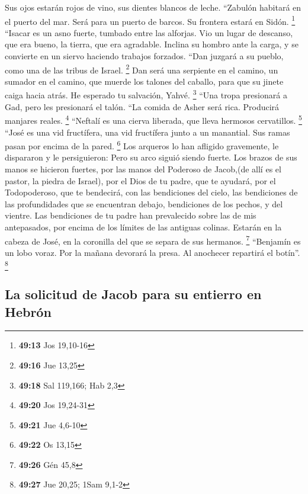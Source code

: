 \begin{paracol}{2}
 Sus ojos estarán rojos de vino, sus dientes blancos de
leche.  ``Zabulón habitará en el puerto del mar. Será
para un puerto de barcos. Su frontera estará en Sidón. \footnote{\textbf{49:13}
  Jos 19,10-16}  ``Isacar es un asno fuerte, tumbado
entre las alforjas.  Vio un lugar de descanso, que era
bueno, la tierra, que era agradable. Inclina su hombro ante la carga, y
se convierte en un siervo haciendo trabajos forzados. 
``Dan juzgará a su pueblo, como una de las tribus de Israel. \footnote{\textbf{49:16}
  Jue 13,25}  Dan será una serpiente en el camino, un
sumador en el camino, que muerde los talones del caballo, para que su
jinete caiga hacia atrás.  He esperado tu salvación,
Yahvé. \footnote{\textbf{49:18} Sal 119,166; Hab 2,3} 
``Una tropa presionará a Gad, pero les presionará el talón.
 ``La comida de Asher será rica. Producirá manjares
reales. \footnote{\textbf{49:20} Jos 19,24-31}  ``Neftalí
es una cierva liberada, que lleva hermosos cervatillos. \footnote{\textbf{49:21}
  Jue 4,6-10}  ``José es una vid fructífera, una vid
fructífera junto a un manantial. Sus ramas pasan por encima de la pared.
\footnote{\textbf{49:22} Os 13,15}  Los arqueros lo han
afligido gravemente, le dispararon y le persiguieron: 
Pero su arco siguió siendo fuerte. Los brazos de sus manos se hicieron
fuertes, por las manos del Poderoso de Jacob,(de allí es el pastor, la
piedra de Israel),  por el Dios de tu padre, que te
ayudará, por el Todopoderoso, que te bendecirá, con las bendiciones del
cielo, las bendiciones de las profundidades que se encuentran debajo,
bendiciones de los pechos, y del vientre.  Las
bendiciones de tu padre han prevalecido sobre las de mis antepasados,
por encima de los límites de las antiguas colinas. Estarán en la cabeza
de José, en la coronilla del que se separa de sus hermanos. \footnote{\textbf{49:26}
  Gén 45,8}  ``Benjamín es un lobo voraz. Por la mañana
devorará la presa. Al anochecer repartirá el botín''. \footnote{\textbf{49:27}
  Jue 20,25; 1Sam 9,1-2}

\hypertarget{la-solicitud-de-jacob-para-su-entierro-en-hebruxf3n}{%
\subsection{La solicitud de Jacob para su entierro en
Hebrón}\label{la-solicitud-de-jacob-para-su-entierro-en-hebruxf3n}}


\end{paracol}
